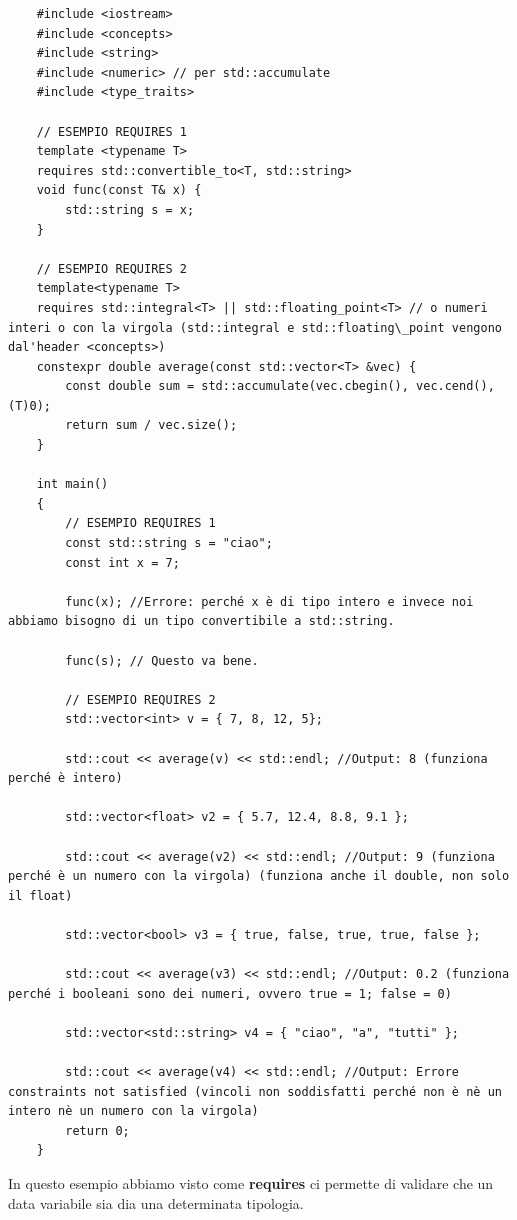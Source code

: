 \begin{lstlisting}
	#include <iostream>
	#include <concepts>
	#include <string>
	#include <numeric> // per std::accumulate
	#include <type_traits>
	
	// ESEMPIO REQUIRES 1
	template <typename T>
	requires std::convertible_to<T, std::string>
	void func(const T& x) {
		std::string s = x;
	}

	// ESEMPIO REQUIRES 2
	template<typename T>
	requires std::integral<T> || std::floating_point<T> // o numeri interi o con la virgola (std::integral e std::floating\_point vengono dal'header <concepts>)
	constexpr double average(const std::vector<T> &vec) {
		const double sum = std::accumulate(vec.cbegin(), vec.cend(), (T)0);        
		return sum / vec.size();
	}

	int main()
	{
		// ESEMPIO REQUIRES 1
		const std::string s = "ciao";
		const int x = 7;
		
		func(x); //Errore: perché x è di tipo intero e invece noi abbiamo bisogno di un tipo convertibile a std::string.
		
		func(s); // Questo va bene.
		
		// ESEMPIO REQUIRES 2
		std::vector<int> v = { 7, 8, 12, 5};
		
		std::cout << average(v) << std::endl; //Output: 8 (funziona perché è intero)
		
		std::vector<float> v2 = { 5.7, 12.4, 8.8, 9.1 };
		
		std::cout << average(v2) << std::endl; //Output: 9 (funziona perché è un numero con la virgola) (funziona anche il double, non solo il float)
		
		std::vector<bool> v3 = { true, false, true, true, false };
		
		std::cout << average(v3) << std::endl; //Output: 0.2 (funziona perché i booleani sono dei numeri, ovvero true = 1; false = 0)
		
		std::vector<std::string> v4 = { "ciao", "a", "tutti" };
		
		std::cout << average(v4) << std::endl; //Output: Errore constraints not satisfied (vincoli non soddisfatti perché non è nè un intero nè un numero con la virgola)
		return 0;
	}
\end{lstlisting}

\textsf{\small In questo esempio abbiamo visto come \textbf{requires} ci permette di validare che un data variabile sia dia una determinata tipologia.} \\

